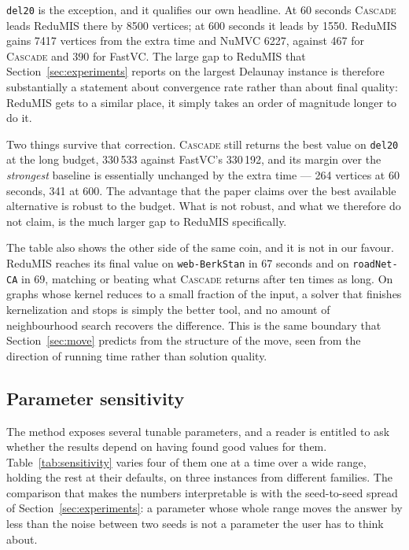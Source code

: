 \documentclass[preprint,12pt]{elsarticle}
\theoremstyle{definition}
\begin{document}
\texttt{del20} is the exception, and it qualifies our own headline. At 60
seconds \textsc{Cascade} leads ReduMIS there by 8500 vertices; at 600 seconds it
leads by 1550. ReduMIS gains 7417 vertices from the extra time and NuMVC 6227,
against 467 for \textsc{Cascade} and 390 for FastVC. The large gap to ReduMIS
that Section~\ref{sec:experiments} reports on the largest Delaunay instance is
therefore substantially a statement about convergence rate rather than about
final quality: ReduMIS gets to a similar place, it simply takes an order of
magnitude longer to do it.

Two things survive that correction. \textsc{Cascade} still returns the best value
on \texttt{del20} at the long budget, 330\,533 against FastVC's 330\,192, and its
margin over the \emph{strongest} baseline is essentially unchanged by the extra
time --- 264 vertices at 60 seconds, 341 at 600. The advantage that the paper
claims over the best available alternative is robust to the budget. What is not
robust, and what we therefore do not claim, is the much larger gap to ReduMIS
specifically.

The table also shows the other side of the same coin, and it is not in our
favour. ReduMIS reaches its final value on \texttt{web-BerkStan} in 67 seconds
and on \texttt{roadNet-CA} in 69, matching or beating what \textsc{Cascade}
returns after ten times as long. On graphs whose kernel reduces to a small
fraction of the input, a solver that finishes kernelization and stops is simply
the better tool, and no amount of neighbourhood search recovers the difference.
This is the same boundary that Section~\ref{sec:move} predicts from the
structure of the move, seen from the direction of running time rather than
solution quality.



\subsection{Parameter sensitivity}
\label{sec:sensitivity}

The method exposes several tunable parameters, and a reader is entitled to ask
whether the results depend on having found good values for them.
Table~\ref{tab:sensitivity} varies four of them one at a time over a wide range,
holding the rest at their defaults, on three instances from different families.
The comparison that makes the numbers interpretable is with the seed-to-seed
spread of Section~\ref{sec:experiments}: a parameter whose whole range moves the
answer by less than the noise between two seeds is not a parameter the user has
to think about.
\end{document}
